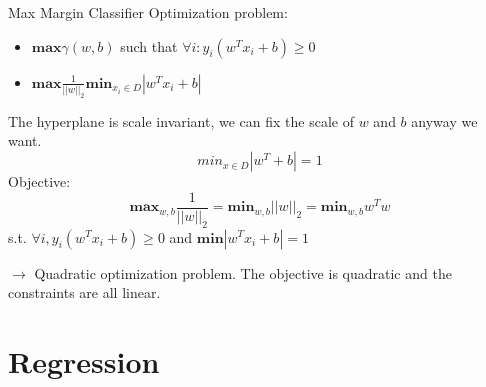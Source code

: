 \documentclass[aspectratio=1610]{beamer}
\begin{document}
\begin{frame}{Max Margin Classifier}
Optimization problem:
\begin{itemize}
    \item $\textbf{max} \gamma(w,b)$ such that $\forall i: y_i(w^Tx_i + b) \geq 0$
    \item $\textbf{max}\frac{1}{||w||_2}\textbf{min}_{x_i\in D}|w^Tx_i + b|$
\end{itemize}
    
The hyperplane is scale invariant, we can fix the scale of $w$ and $b$ anyway we want.
$$min_{x\in D}|w^T+b| = 1$$
Objective:
$$\textbf{max}_{w,b}\frac{1}{||w||_2} = \textbf{min}_{w,b}||w||_2 = \textbf{min}_{w,b}w^Tw$$
s.t. $\forall i, y_i(w^Tx_i+b) \geq 0$ and $\textbf{min}|w^Tx_i + b| = 1$

$\to$ Quadratic optimization problem. The objective is quadratic and the constraints are all linear. 
\end{frame}


\section{Regression}
\end{document}
